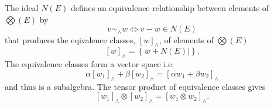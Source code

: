 \documentclass[aps,preprint]{revtex4}%
\begin{document}
The ideal $N\left(  E\right)  $ defines an equivalence relationship between
elements of $%
{\textstyle\bigotimes}
\left(  E\right)  $ by
\begin{equation}
v\sim_{\wedge}w\Leftrightarrow v-w\in N\left(  E\right)
\end{equation}
that produces the eqivalence classes, $\left[  w\right]  _{\wedge}$, of
elements of $%
{\textstyle\bigotimes}
\left(  E\right)  $
\begin{equation}
\left[  w\right]  _{\wedge}=\left\{  \left.  w+N\left(  E\right)  \right\vert
\right\}  .
\end{equation}
The equivalence classes form a vector space i.e.
\begin{equation}
\alpha\left[  w_{1}\right]  _{\wedge}+\beta\left[  w_{2}\right]  _{\wedge
}=\left[  \alpha w_{1}+\beta w_{2}\right]  _{\wedge}%
\end{equation}
and thus is a subalgebra. The tensor product of equivalence classes gives
\begin{equation}
\left[  w_{1}\right]  _{\wedge}\otimes\left[  w_{2}\right]  _{\wedge}=\left[
w_{1}\otimes w_{2}\right]  _{\wedge}.
\end{equation}
\end{document}
